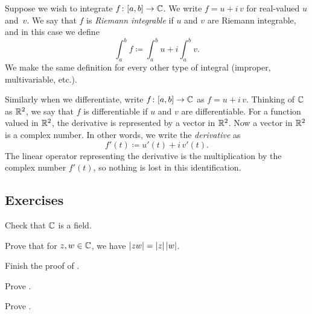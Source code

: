 Suppose we wish to integrate
$f \colon [a,b] \to {\mathbb{C}}$.  We write
$f = u+i\,v$ for real-valued $u$ and~$v$.
We say that $f$ is \emph{Riemann integrable}
if $u$ and $v$ are Riemann
integrable, and in this case we define
\begin{equation*}
\int_a^b f \coloneqq \int_a^b u + i \int_a^b v .
\end{equation*}
We make the same definition for every other type of integral (improper,
multivariable, etc.).

Similarly when we differentiate, write $f \colon [a,b] \to {\mathbb{C}}$ as
$f = u+i\,v$.  Thinking of ${\mathbb{C}}$ as ${\mathbb{R}}^2$, we say that $f$ is differentiable
if $u$ and $v$ are differentiable.  For a function valued in ${\mathbb{R}}^2$, the derivative
is represented by a vector in ${\mathbb{R}}^2$.  Now a vector in ${\mathbb{R}}^2$ is a complex
number.  In other words,
we write
the
\emph{derivative}
as
\begin{equation*}
f'(t) \coloneqq u'(t) + i \, v'(t) .
\end{equation*}
The linear operator representing the derivative is the multiplication by
the complex number $f'(t)$, so nothing is lost in this identification.


\subsection{Exercises}

\begin{exercise}
Check that ${\mathbb{C}}$ is a field.
\end{exercise}

\begin{exercise}
Prove that for $z,w \in {\mathbb{C}}$, we have
$\lvert {zw} \rvert = \lvert {z} \rvert \, \lvert {w} \rvert$.
\end{exercise}

\begin{exercise}
Finish the proof of .
\end{exercise}

\begin{exercise}
Prove .
\end{exercise}

\begin{exercise}
Prove .
\end{exercise}

